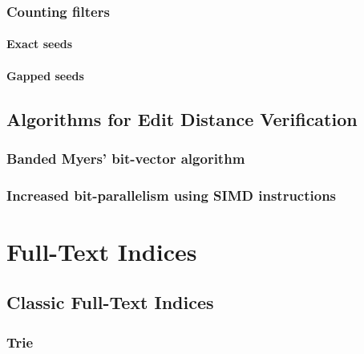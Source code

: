 \section{Counting filters}
\subsection{Exact seeds}
\subsection{Gapped seeds}

\chapter{Algorithms for Edit Distance Verification}
\section{Banded Myers' bit-vector algorithm}
\section{Increased bit-parallelism using SIMD instructions}


\part{Full-Text Indices}

\chapter{Classic Full-Text Indices}
\section{Trie}
